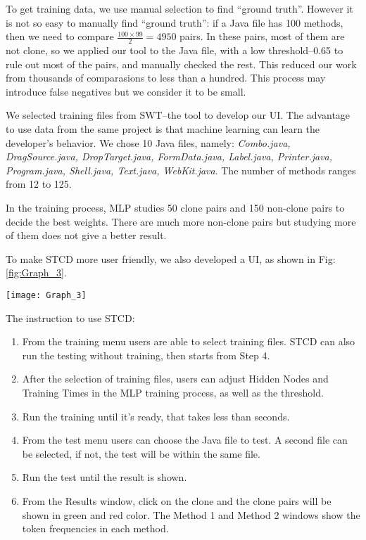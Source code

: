 \documentclass[../main.tex]{subfiles}
\begin{document}
To get training data, we use manual selection to find ``ground truth''. However it is not so easy to manually find ``ground truth'': if a Java file has 100 methods, then we need to compare $\frac{100\times 99}{2} = 4950$ pairs. In these pairs, most of them are not clone, so we applied our tool to the Java file, with a low threshold--0.65 to rule out most of the pairs, and manually checked the rest. This reduced our work from thousands of comparasions to less than a hundred. This process may introduce false negatives but we consider it to be small.

We selected training files from SWT--the tool to develop our UI. The advantage to use data from the same project is that machine learning can learn the developer's behavior. We chose 10 Java files, namely: \textit{Combo.java, DragSource.java, DropTarget.java, FormData.java, Label.java, Printer.java, Program.java, Shell.java, Text.java, WebKit.java}. The number of methods ranges from 12 to 125.

In the training process, MLP studies 50 clone pairs and 150 non-clone pairs to decide the best weights. There are much more non-clone pairs but studying more of them does not give a better result.

To make STCD more user friendly, we also developed a UI, as shown in Fig:\ref{fig:Graph_3}.

\begin{figure*}
\centering \texttt{[image: Graph\_3]} 
\caption{User Interface} \label{fig:Graph_3}
\end{figure*}

The instruction to use STCD:

\begin{enumerate}
\item From the training menu users are able to select training files. STCD can also run the testing without training, then starts from Step 4.
\item After the selection of training files, users can adjust Hidden Nodes and Training Times in the MLP training process, as well as the threshold. 
\item Run the training until it's ready, that takes less than seconds. 
\item From the test menu users can choose the Java file to test. A second file can be selected, if not, the test will be within the same file. 
\item Run the test until the result is shown.
\item From the Results window, click on the clone and the clone pairs will be shown in green and red color. The Method 1 and Method 2 windows show the token frequencies in each method.  
\end{enumerate}
\end{document}
